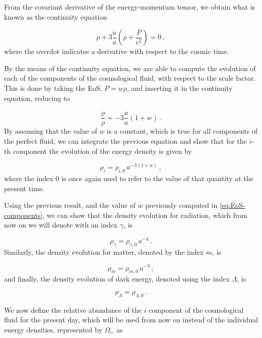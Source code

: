 From the covariant derivative of the energy-momentum tensor, we obtain what is known as the continuity equation

\begin{equation}
    \label{eq:continuity}
    \dot{\rho} + 3 \frac{\dot{a}}{a} \left(\rho + \frac{P}{c^2} \right) = 0 \,,
\end{equation}
where the overdot indicates a derivative with respect to the cosmic time.

By the means of the continuity equation, we are able to compute the evolution of each of the components of the cosmological fluid, with respect to the scale factor. This is done by taking the
\gls{EoS}, $P = w \rho$, and inserting it in the continuity equation, reducing to

\begin{equation}
    \frac{\dot{\rho}}{\rho} = -3 \frac{\dot{a}}{a}(1 + w) \,.
\end{equation}
By assuming that the value of $w$ is a constant, which is true for all components of the perfect fluid, we can integrate the previous equation and show that for the $i$-th component the evolution of the energy density is given by

\begin{equation}
    \rho_i = \rho_{i,0} \, a^{-3(1+w)} \,,
\end{equation}
where the index $0$ is once again used to refer to the value of that quantity at the present time.

Using the previous result, and the value of $w$ previously computed in \cref{eq:EoS-components}, we can show that the density evolution for radiation, which from now on we will denote with an index $\gamma$, is

\begin{equation}
    \rho_\gamma = \rho_{\gamma, 0} \, a^{-4} \,.
\end{equation}
Similarly, the density evolution for matter, denoted by the index $m$, is

\begin{equation}
    \rho_m = \rho_{m,0} \, a^{-3} \,,
\end{equation}
and finally, the density evolution of dark energy, denoted using the index $\Lambda$, is

\begin{equation}
    \rho_\Lambda = \rho_{\Lambda,0} \,.
\end{equation}

We now define the relative abundance of the $i$ component of the cosmological fluid for the present day, which will be used from now on instead of the individual energy densities, represented by $\Omega_i$, as

